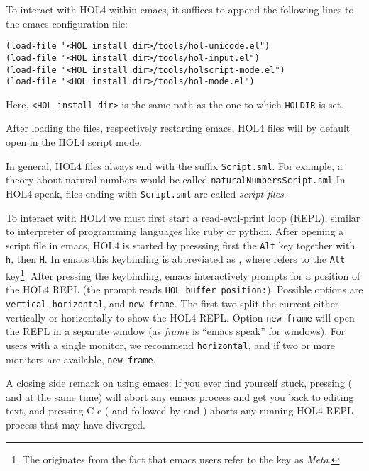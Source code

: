 To interact with HOL4 within emacs, it suffices to append the following lines to
the emacs configuration file:
\begin{lstlisting}
(load-file "<HOL install dir>/tools/hol-unicode.el")
(load-file "<HOL install dir>/tools/hol-input.el")
(load-file "<HOL install dir>/tools/holscript-mode.el")
(load-file "<HOL install dir>/tools/hol-mode.el")
\end{lstlisting}
\noindent Here, \lstinline{<HOL install dir>} is the same path as the one
to which \texttt{HOLDIR} is set.

After loading the files, respectively restarting emacs, HOL4 files will by
default open in the HOL4 script mode.

In general, HOL4 files always end with the suffix \texttt{Script.sml}.
For example, a theory about natural numbers would be called
\texttt{naturalNumbersScript.sml}
In HOL4 speak, files ending with \texttt{Script.sml} are called \emph{script files}.

To interact with HOL4 we must first start a read-eval-print loop (REPL), similar
to interpreter of programming languages like ruby or python.
After opening a script file in emacs, HOL4 is started by presssing
first the \texttt{Alt} key together with \texttt{h}, then \texttt{H}.
In emacs this keybinding is abbreviated as , where  refers
to the \texttt{Alt} key\footnote{The  originates from the fact that
  emacs users refer to the  key as \emph{Meta}.}.
After pressing the keybinding, emacs interactively prompts for a position of
the HOL4 REPL (the prompt reads \lstinline{HOL buffer position:}).
Possible options are \texttt{vertical}, \texttt{horizontal}, and
\texttt{new-frame}.
The first two split the current either vertically or horizontally to show the
HOL4 REPL.
Option \texttt{new-frame} will open the REPL in a separate window (as
\emph{frame} is ``emacs speak'' for windows).
For users with a single monitor, we recommend \texttt{horizontal}, and if two
or more monitors are available, \texttt{new-frame}.

A closing side remark on using emacs:
If you ever find yourself stuck, pressing  ( and
 at the same time) will abort any emacs process and get you back to
editing text, and pressing  {C-c} ( and  followed by
 and ) aborts any running HOL4 REPL process that may have
diverged.
